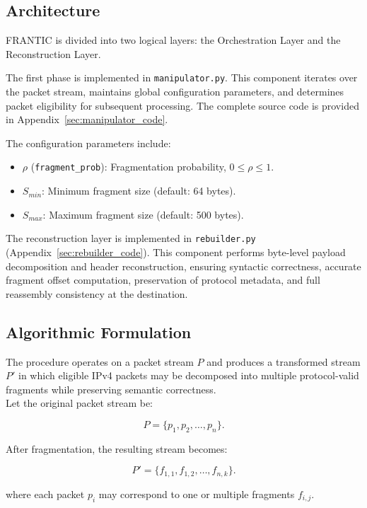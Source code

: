 \subsection{Architecture}
FRANTIC is divided into two logical layers: the Orchestration Layer and the Reconstruction Layer.

The first phase is implemented in \texttt{manipulator.py}. This component iterates over the packet stream, maintains global configuration parameters, and determines packet eligibility for subsequent processing. The complete source code is provided in Appendix~\ref{sec:manipulator_code}.

The configuration parameters include:

\begin{itemize}
    \item $\rho$ (\texttt{fragment\_prob}): Fragmentation probability, $0 \le \rho \le 1$.
    \item $S_{min}$: Minimum fragment size (default: 64 bytes).
    \item $S_{max}$: Maximum fragment size (default: 500 bytes).
\end{itemize}

The reconstruction layer is implemented in \texttt{rebuilder.py} (Appendix~\ref{sec:rebuilder_code}). This component performs byte-level payload decomposition and header reconstruction, ensuring syntactic correctness, accurate fragment offset computation, preservation of protocol metadata, and full reassembly consistency at the destination.

\subsection{Algorithmic Formulation}
\label{sec:algorithm}

The procedure operates on a packet stream $P$ and produces a transformed stream $P'$ in which eligible IPv4 packets may be decomposed into multiple protocol-valid fragments while preserving semantic correctness.
\\

Let the original packet stream be:

\[
P = \{p_1, p_2, \dots, p_n\}.
\]

After fragmentation, the resulting stream becomes:

\[
P' = \{f_{1,1}, f_{1,2}, \dots, f_{n,k}\}.
\]

where each packet $p_i$ may correspond to one or multiple fragments $f_{i,j}$.
\\

